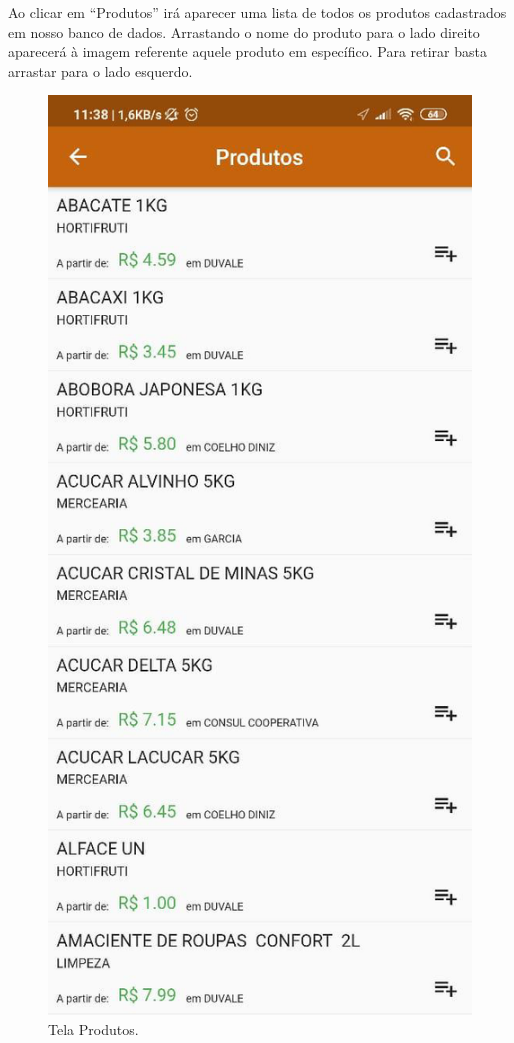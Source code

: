 Ao clicar em “Produtos” irá aparecer uma lista de todos os produtos cadastrados em nosso banco de dados. Arrastando o nome do produto para o lado direito aparecerá à imagem referente aquele produto em específico. Para retirar basta arrastar para o lado esquerdo.
\begin{figure}[H]
    \centering
    \caption{Tela Produtos.}
    \includegraphics[scale=0.3]{Imagens/Print03.png}
\end{figure}


